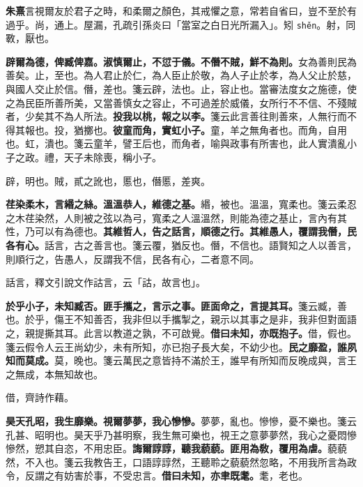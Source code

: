 \begin{quoting}\textbf{朱熹}言視爾友於君子之時，和柔爾之顏色，其戒懼之意，常若自省曰，豈不至於有過乎。尚，通上。屋漏，孔疏引孫炎曰「當室之白日光所漏入」。矧 \texttt{shěn}。射，同斁，厭也。\end{quoting}

\textbf{辟爾為德，俾臧俾嘉。淑慎爾止，不愆于儀。不僭不賊，鮮不為則。}{\footnotesize 女為善則民為善矣。止，至也。為人君止於仁，為人臣止於敬，為人子止於孝，為人父止於慈，與國人交止於信。僭，差也。箋云辟，法也。止，容止也。當審法度女之施德，使之為民臣所善所美，又當善慎女之容止，不可過差於威儀，女所行不不信、不殘賊者，少矣其不為人所法。}\textbf{投我以桃，報之以李。}{\footnotesize 箋云此言善往則善來，人無行而不得其報也。投，猶擲也。}\textbf{彼童而角，實虹小子。}{\footnotesize 童，羊之無角者也。而角，自用也。虹，潰也。箋云童羊，譬王后也，而角者，喻與政事有所害也，此人實潰亂小子之政。禮，天子未除喪，稱小子。}

\begin{quoting}辟，明也。賊，貳之訛也，慝也，僭慝，差爽。\end{quoting}

\textbf{荏染柔木，言緡之絲。溫溫恭人，維德之基。}{\footnotesize 緡，被也。溫溫，寬柔也。箋云柔忍之木荏染然，人則被之弦以為弓，寬柔之人溫溫然，則能為德之基止，言內有其性，乃可以有為德也。}\textbf{其維哲人，告之話言，順德之行。其維愚人，覆謂我僭，民各有心。}{\footnotesize 話言，古之善言也。箋云覆，猶反也。僭，不信也。語賢知之人以善言，則順行之，告愚人，反謂我不信，民各有心，二者意不同。}

\begin{quoting}話言，釋文引說文作詁言，云「詁，故言也」。\end{quoting}

\textbf{於乎小子，未知臧否。匪手攜之，言示之事。匪面命之，言提其耳。}{\footnotesize 箋云臧，善也。於乎，傷王不知善否，我非但以手攜掣之，親示以其事之是非，我非但對面語之，親提撕其耳。此言以教道之孰，不可啟覺。}\textbf{借曰未知，亦既抱子。}{\footnotesize 借，假也。箋云假令人云王尚幼少，未有所知，亦已抱子長大矣，不幼少也。}\textbf{民之靡盈，誰夙知而莫成。}{\footnotesize 莫，晚也。箋云萬民之意皆持不滿於王，誰早有所知而反晚成與，言王之無成，本無知故也。}

\begin{quoting}借，齊詩作藉。\end{quoting}

\textbf{昊天孔昭，我生靡樂。視爾夢夢，我心慘慘。}{\footnotesize 夢夢，亂也。慘慘，憂不樂也。箋云孔甚、昭明也。昊天乎乃甚明察，我生無可樂也，視王之意夢夢然，我心之憂悶慘慘然，愬其自恣，不用忠臣。}\textbf{誨爾諄諄，聽我藐藐。匪用為敎，覆用為虐。}{\footnotesize 藐藐然，不入也。箋云我教告王，口語諄諄然，王聽聆之藐藐然忽略，不用我所言為政令，反謂之有妨害於事，不受忠言。}\textbf{借曰未知，亦聿既耄。}{\footnotesize 耄，老也。}

